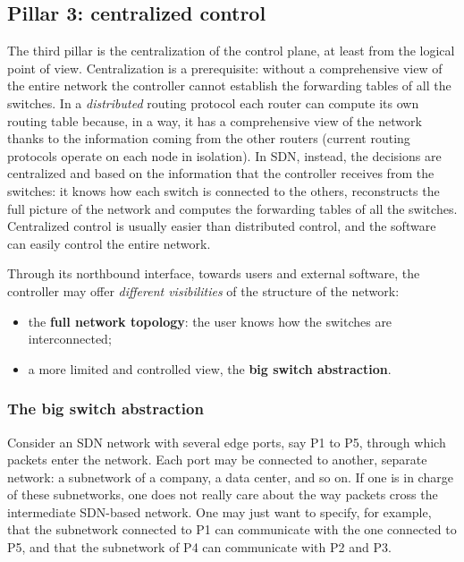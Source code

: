 \subsection{Pillar 3: centralized control}

The third pillar is the centralization of the control plane, at least from the logical point of view. Centralization is a prerequisite: without a comprehensive view of the entire network the controller cannot establish the forwarding tables of all the switches. In a \emph{distributed} routing protocol each router can compute its own routing table because, in a way, it has a comprehensive view of the network thanks to the information coming from the other routers (current routing protocols operate on each node in isolation). In SDN, instead, the decisions are centralized and based on the information that the controller receives from the switches: it knows how each switch is connected to the others, reconstructs the full picture of the network and computes the forwarding tables of all the switches. Centralized control is usually easier than distributed control, and the software can easily control the entire network.

Through its northbound interface, towards users and external software, the controller may offer \emph{different visibilities} of the structure of the network:

\begin{itemize}
\item the \textbf{full network topology}: the user knows how the switches are interconnected;
\item a more limited and controlled view, the \textbf{big switch abstraction}.
\end{itemize}

\subsubsection*{The big switch abstraction}

Consider an SDN network with several edge ports, say P1 to P5, through which packets enter the network. Each port may be connected to another, separate network: a subnetwork of a company, a data center, and so on. If one is in charge of these subnetworks, one does not really care about the way packets cross the intermediate SDN-based network. One may just want to specify, for example, that the subnetwork connected to P1 can communicate with the one connected to P5, and that the subnetwork of P4 can communicate with P2 and P3.

